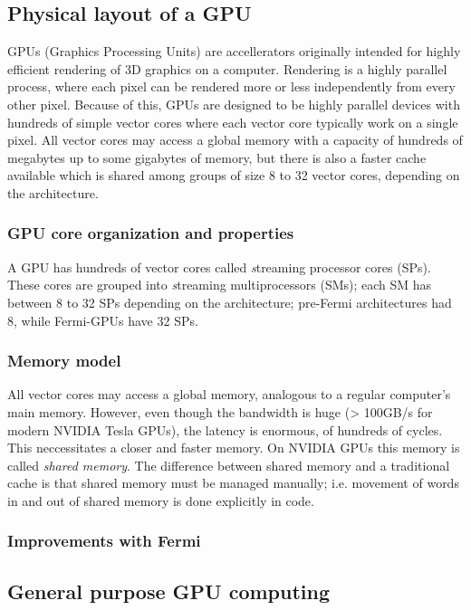 \subsection{Physical layout of a GPU}
GPUs (Graphics Processing Units) are accellerators originally intended for highly efficient rendering of 3D graphics on a computer. Rendering is a highly parallel process, where each pixel can be rendered more or less independently from every other pixel. Because of this, GPUs are designed to be highly parallel devices with hundreds of simple vector cores where each vector core typically work on a single pixel. All vector cores may access a global memory with a capacity of hundreds of megabytes up to some gigabytes of memory, but there is also a faster cache available which is shared among groups of size 8 to 32 vector cores, depending on the architecture.

\subsubsection{GPU core organization and properties}
A GPU has hundreds of vector cores called {\textit streaming processor cores} (SPs). These cores are grouped into {\textit streaming multiprocessors} (SMs); each SM has between 8 to 32 SPs depending on the architecture; pre-Fermi architectures had 8, while Fermi-GPUs have 32 SPs. 

\subsubsection{Memory model}
All vector cores may access a global memory, analogous to a regular computer's main memory. However, even though the bandwidth is huge (> 100GB/s for modern NVIDIA Tesla GPUs), the latency is enormous, of hundreds of cycles. This neccessitates a closer and faster memory. On NVIDIA GPUs this memory is called \textit{shared memory}. The difference between shared memory and a traditional cache is that shared memory must be managed manually; i.e. movement of words in and out of shared memory is done explicitly in code.

\subsubsection{Improvements with Fermi}

\subsection{General purpose GPU computing}

